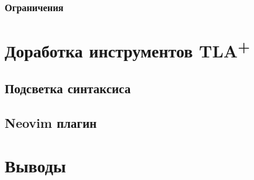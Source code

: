 \documentclass[14pt, openany]{book}
\newcommand{\tlapl}{TLA\textsuperscript{+} }
\begin{document}
\subsection{Ограничения}

\chapter{Доработка инструментов \tlapl}

\section{Подсветка синтаксиса}

\section{Neovim плагин}

\chapter{Выводы}



\end{document}
